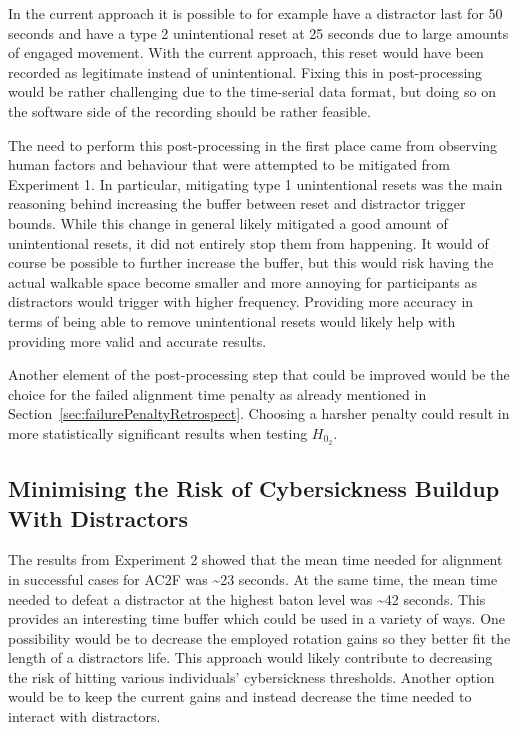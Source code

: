 In the current approach it is possible to for example have a distractor last for 50 seconds and have a type 2 unintentional reset at 25 seconds due to large amounts of engaged movement. With the current approach, this reset would have been recorded as legitimate instead of unintentional. Fixing this in post-processing would be rather challenging due to the time-serial data format, but doing so on the software side of the recording should be rather feasible. 

The need to perform this post-processing in the first place came from observing human factors and behaviour that were attempted to be mitigated from Experiment 1. In particular, mitigating type 1 unintentional resets was the main reasoning behind increasing the buffer between reset and distractor trigger bounds. While this change in general likely mitigated a good amount of unintentional resets, it did not entirely stop them from happening. It would of course be possible to further increase the buffer, but this would risk having the actual walkable space become smaller and more annoying for participants as distractors would trigger with higher frequency. Providing more accuracy in terms of being able to remove unintentional resets would likely help with providing more valid and accurate results. 

Another element of the post-processing step that could be improved would be the choice for the failed alignment time penalty as already mentioned in Section~\ref{sec:failurePenaltyRetrospect}. Choosing a harsher penalty could result in more statistically significant results when testing $H_{0_2}$.

\subsection{Minimising the Risk of Cybersickness Buildup With Distractors}\label{sec:ex2MinimisingCybersickness}

The results from Experiment 2 showed that the mean time needed for alignment in successful cases for AC2F was \textasciitilde23 seconds. At the same time, the mean time needed to defeat a distractor at the highest baton level was \textasciitilde42 seconds. This provides an interesting time buffer which could be used in a variety of ways. One possibility would be to decrease the employed rotation gains so they better fit the length of a distractors life. This approach would likely contribute to decreasing the risk of hitting various individuals' cybersickness thresholds. Another option would be to keep the current gains and instead decrease the time needed to interact with distractors. 


